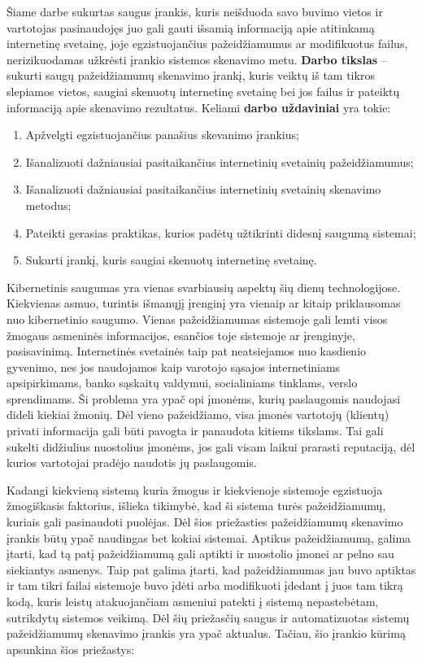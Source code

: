 Šiame darbe sukurtas saugus įrankis, kuris neišduoda savo buvimo vietos ir vartotojas pasinaudojęs juo gali gauti išsamią informaciją apie atitinkamą internetinę svetainę, joje egzistuojančius pažeidžiamumus ar modifikuotus failus, nerizikuodamas užkrėsti įrankio sistemos skenavimo metu. \textbf{Darbo tikslas} – sukurti saugų pažeidžiamumų skenavimo įrankį, kuris veiktų iš tam tikros slepiamos vietos, saugiai skenuotų internetinę
svetainę bei jos failus ir pateiktų informaciją apie skenavimo rezultatus. Keliami \textbf{darbo uždaviniai} yra tokie:

\begin{enumerate}
	\item Apžvelgti egzistuojančius panašius skevanimo įrankius;
	\item Išanalizuoti dažniausiai pasitaikančius internetinių svetainių pažeidžiamumus;
	\item Išanalizuoti dažniausiai pasitaikančius internetinių svetainių skenavimo metodus;
	\item Pateikti gerasias praktikas, kurios padėtų užtikrinti didesnį saugumą sistemai;
	\item Sukurti įrankį, kuris saugiai skenuotų internetinę svetainę.
\end{enumerate}


Kibernetinis saugumas yra vienas svarbiausių aspektų šių dienų technologijose. Kiekvienas asmuo, turintis išmanųjį įrenginį yra vienaip ar kitaip priklausomas nuo kibernetinio saugumo. Vienas pažeidžiamumas sistemoje gali lemti visos žmogaus asmeninės informacijos, esančios toje sistemoje ar įrenginyje, pasisavinimą. Internetinės svetainės taip pat neatsiejamos nuo kasdienio gyvenimo, nes jos naudojamos kaip varotojo sąsajos internetiniams apsipirkimams, banko sąskaitų valdymui, socialiniams tinklams, verslo sprendimams. Ši problema yra ypač opi įmonėms, kurių paslaugomis naudojasi dideli kiekiai žmonių. Dėl vieno pažeidžiamo, visa įmonės vartotojų (klientų) privati informacija gali būti pavogta ir panaudota kitiems tikslams. Tai gali sukelti didžiulius nuostolius įmonėms, jos gali visam laikui prarasti reputaciją, dėl kurios vartotojai pradėjo naudotis jų paslaugomis.

Kadangi kiekvieną sistemą kuria
žmogus ir kiekvienoje sistemoje egzistuoja žmogiškasis faktorius, išlieka tikimybė, kad ši sistema turės
pažeidžiamumų, kuriais gali pasinaudoti puolėjas. Dėl šios priežasties
pažeidžiamumų skenavimo įrankis būtų ypač naudingas bet kokiai sistemai. Aptikus pažeidžiamumą, galima įtarti, kad
tą patį pažeidžiamumą gali aptikti ir nuostolio įmonei ar pelno sau siekiantys asmenys. Taip pat galima įtarti, kad pažeidžiamumas jau buvo aptiktas ir tam tikri
failai sistemoje buvo įdėti arba modifikuoti įdedant į juos tam tikrą kodą, kuris leistų atakuojančiam asmeniui patekti į sistemą
nepastebėtam, sutrikdytų sistemos veikimą.
Dėl šių priežasčių saugus ir automatizuotas sistemų pažeidžiamumų skenavimo įrankis yra
ypač aktualus. Tačiau, šio įrankio kūrimą apsunkina šios priežastys:

